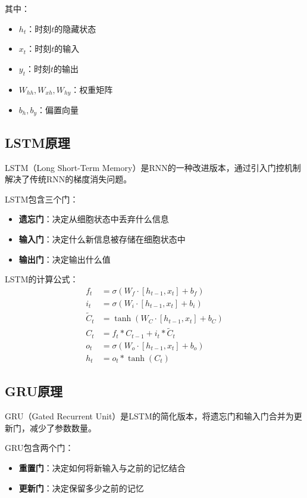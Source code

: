 \documentclass[a4paper]{article}
\begin{document}
其中：
\begin{itemize}
    \item $h_t$：时刻$t$的隐藏状态
    \item $x_t$：时刻$t$的输入
    \item $y_t$：时刻$t$的输出
    \item $W_{hh}, W_{xh}, W_{hy}$：权重矩阵
    \item $b_h, b_y$：偏置向量
\end{itemize}

\subsection{LSTM原理}
LSTM（Long Short-Term Memory）是RNN的一种改进版本，通过引入门控机制解决了传统RNN的梯度消失问题。

LSTM包含三个门：
\begin{itemize}
    \item \textbf{遗忘门}：决定从细胞状态中丢弃什么信息
    \item \textbf{输入门}：决定什么新信息被存储在细胞状态中
    \item \textbf{输出门}：决定输出什么值
\end{itemize}

LSTM的计算公式：
\begin{align}
    f_t &= \sigma(W_f \cdot [h_{t-1}, x_t] + b_f) \\
    i_t &= \sigma(W_i \cdot [h_{t-1}, x_t] + b_i) \\
    \tilde{C}_t &= \tanh(W_C \cdot [h_{t-1}, x_t] + b_C) \\
    C_t &= f_t * C_{t-1} + i_t * \tilde{C}_t \\
    o_t &= \sigma(W_o \cdot [h_{t-1}, x_t] + b_o) \\
    h_t &= o_t * \tanh(C_t)
\end{align}

\subsection{GRU原理}
GRU（Gated Recurrent Unit）是LSTM的简化版本，将遗忘门和输入门合并为更新门，减少了参数数量。

GRU包含两个门：
\begin{itemize}
    \item \textbf{重置门}：决定如何将新输入与之前的记忆结合
    \item \textbf{更新门}：决定保留多少之前的记忆
\end{itemize}
\end{document}
